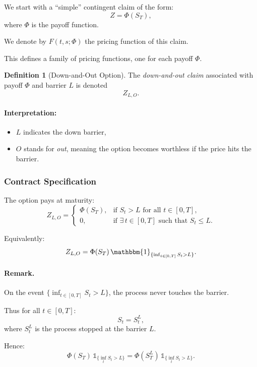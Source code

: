 \documentclass[12pt,a4paper]{article}
\theoremstyle{definition}
\newtheorem{definition}{Definition}[section]
\begin{document}
We start with a ``simple'' contingent claim of the form:
\[
Z = \Phi(S_T),
\]
where $\Phi$ is the payoff function.

We denote by $F(t, s; \Phi)$ the pricing function of this claim.

This defines a family of pricing functions, one for each payoff $\Phi$.

\begin{definition}[Down-and-Out Option]
The \emph{down-and-out claim} associated with payoff $\Phi$ and barrier $L$ is denoted
\[
Z_{L,O}.
\]

\paragraph{Interpretation:}

\begin{itemize}
\item $L$ indicates the down barrier,
\item $O$ stands for \emph{out}, meaning the option becomes worthless if the price hits the barrier.
\end{itemize}
\end{definition}

\subsubsection{Contract Specification}

The option pays at maturity:
\[
Z_{L,O} = \begin{cases}
\Phi(S_T), & \text{if } S_t > L \text{ for all } t \in [0, T], \\
0, & \text{if } \exists\, t \in [0, T] \text{ such that } S_t \leq L.
\end{cases}
\]

Equivalently:
\[
Z_{L,O} = \Phi(S_T)\, \mathbbm{1}_{\{\inf_{t \in [0,T]} S_t > L\}}.
\]

\paragraph{Remark.}

On the event $\{\inf_{t \in [0,T]} S_t > L\}$, the process never touches the barrier.

Thus for all $t \in [0, T]$:
\[
S_t = S_t^L,
\]
where $S_t^L$ is the process stopped at the barrier $L$.

Hence:
\[
\Phi(S_T)\, \mathds{1}_{\{\inf_t S_t > L\}} = \Phi(S_T^L)\, \mathds{1}_{\{\inf_t S_t > L\}}.
\]
\end{document}
